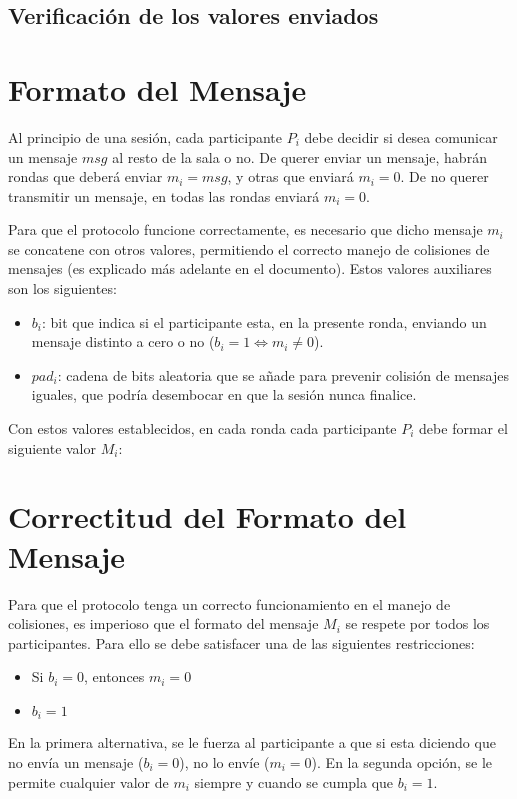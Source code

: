 \subsection{Verificación de los valores enviados}


\section{Formato del Mensaje}

Al principio de una sesión, cada participante $P_i$ debe decidir si desea comunicar un mensaje $msg$ al resto de la sala o no. De querer enviar un mensaje, habrán rondas que deberá enviar $m_i = msg$, y otras que enviará $m_i = 0$. De no querer transmitir un mensaje, en todas las rondas enviará $m_i = 0$. 

Para que el protocolo funcione correctamente, es necesario que dicho mensaje $m_i$ se concatene con otros valores, permitiendo el correcto manejo de colisiones de mensajes (es explicado más adelante en el documento). Estos valores auxiliares son los siguientes:
\begin{itemize}
    \item $b_i$: bit que indica si el participante esta, en la presente ronda, enviando un mensaje distinto a cero o no ($b_i = 1 \iff m_i \neq 0$).
    \item $pad_i$: cadena de bits aleatoria que se añade para prevenir colisión de mensajes iguales, que podría desembocar en que la sesión nunca finalice.
\end{itemize}

Con estos valores establecidos, en cada ronda cada participante $P_i$ debe formar el siguiente valor $M_i$:


\section{Correctitud del Formato del Mensaje}

Para que el protocolo tenga un correcto funcionamiento en el manejo de colisiones, es imperioso que el formato del mensaje $M_i$ se respete por todos los participantes. Para ello se debe satisfacer una de las siguientes restricciones:
\begin{itemize}
    \item Si $b_i = 0$, entonces $m_i = 0$
    \item $b_i = 1$
\end{itemize}
En la primera alternativa, se le fuerza al participante a que si esta diciendo que no envía un mensaje ($b_i = 0$), no lo envíe ($m_i = 0$). En la segunda opción, se le permite cualquier valor de $m_i$ siempre y cuando se cumpla que $b_i = 1$.

